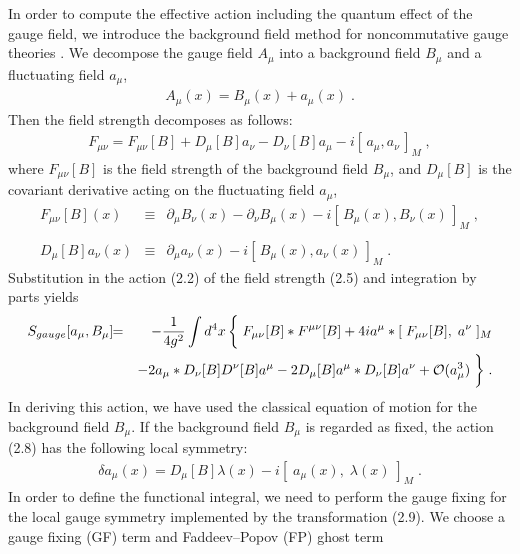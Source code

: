 \documentclass[a4paper,12pt]{article}
\begin{document}
In order to compute the effective action including the quantum effect 
of the gauge field, we introduce the background field method for 
noncommutative gauge theories \cite{VVKGT, CPMFRR}. We decompose 
the gauge field $A_{\mu}$ into a background field $B_{\mu}$ and a fluctuating 
field $a_{\mu}$,
%
%
\begin{eqnarray}
A_{\mu}(x) = B_{\mu}(x) + a_{\mu}(x) \;.
\end{eqnarray}
%
Then the field strength decomposes as follows: 
%
%
\begin{eqnarray}
F_{\mu\nu} = F_{\mu\nu}[B] + D_{\mu}[B]a_{\nu} - D_{\nu}[B]a_{\mu} 
-i[\,a_{\mu}, a_{\nu}\,]_{M} \;,
\end{eqnarray}
%
where $F_{\mu\nu}[B]$ is the field strength of the background field $B_{\mu}$,  and $D_{\mu}[B]$ is the covariant derivative acting on the fluctuating 
field $a_{\mu}$, 
%
%
\begin{eqnarray}
F_{\mu\nu}[B](x) \!\!&\equiv&\!\! \partial_{\mu}B_{\nu}(x) - \partial_{\nu}B_{\mu}(x) 
-i[\,B_{\mu}(x), B_{\nu}(x) \,]_{M} \;, \\
 & & \nonumber \\
D_{\mu}[B]a_{\nu}(x) \!\!&\equiv&\!\! \partial_{\mu}a_{\nu}(x) 
-i[\,B_{\mu}(x), a_{\nu}(x) \,]_{M} \;.
\end{eqnarray}
% 
Substitution in the action (2.2) of the field strength (2.5) and 
integration by parts yields
%
%
\begin{eqnarray}
S_{gauge}[a_{\mu}, B_{\mu}] \!\!&=&\!\! -\frac{1}{4g^{2}} \int d^{4}x \,
\biggl\{\; \biggr. F_{\mu\nu}[B] \ast F^{\mu\nu}[B] 
+ 4i a^{\mu} \ast [\; F_{\mu\nu}[B], \; a^{\nu} \;]_{M}   
\nonumber \\
& & -2a_{\mu} \ast D_{\nu}[B]D^{\nu}[B]a^{\mu} 
-2D_{\mu}[B]a^{\mu} \ast D_{\nu}[B]a^{\nu} + {\cal O}(a_{\mu}^{3}) 
\biggl. \; \biggr\} \;.
\end{eqnarray}
%
In deriving this action, we have used the classical 
equation of motion for the background field $B_{\mu}$. If the background 
field $B_{\mu}$ is regarded as fixed, the action (2.8) has the following 
local symmetry: 
%
%
\begin{eqnarray}
\delta a_{\mu}(x) = D_{\mu}[B] \lambda(x) 
-i [\;a_{\mu}(x), \; \lambda(x) \;]_{M} \;.  
\end{eqnarray}
%
In order to define 
the functional integral, we need to perform the gauge fixing for the local 
gauge symmetry implemented by the transformation (2.9). We choose a gauge 
fixing (GF) term and Faddeev--Popov (FP) ghost term 
\end{document}
